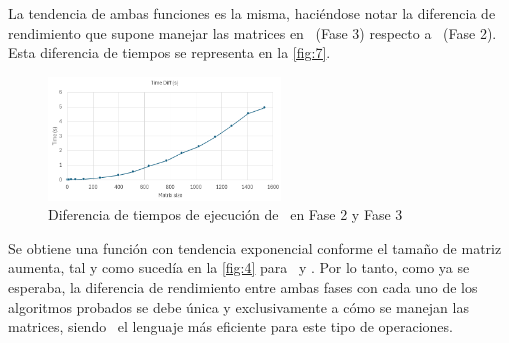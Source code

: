 La tendencia de ambas funciones es la misma, haciéndose notar la diferencia de rendimiento que supone manejar las matrices 
en \C\ (Fase 3) respecto a \python\ (Fase 2). Esta diferencia de tiempos se representa en la \autoref{fig:7}.

\begin{figure}[h]
    \centering
    \includegraphics[width=0.55\textwidth]{img/7.png}
    \caption{Diferencia de tiempos de ejecución de \zorder\ en Fase 2 y Fase 3}
    \label{fig:7}
\end{figure}

Se obtiene una función con tendencia exponencial conforme el tamaño de matriz aumenta, tal y como sucedía en la 
\autoref{fig:4} para \rowmajor\ y \colmajor. Por lo tanto, como ya se esperaba, la diferencia de rendimiento entre 
ambas fases con cada uno de los algoritmos probados se debe única y exclusivamente a cómo se manejan las matrices, 
siendo \C\ el lenguaje más eficiente para este tipo de operaciones.

